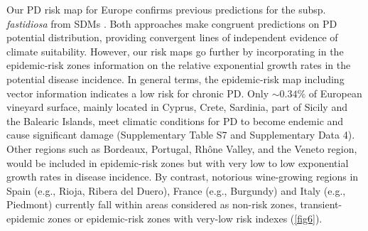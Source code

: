     Our PD risk map for Europe confirms previous predictions for the subsp.
    \textit{fastidiosa} from SDMs \cite{Bragard2019}. Both approaches make
    congruent predictions on PD potential distribution, providing convergent
    lines
    of independent evidence of climate suitability. However, our risk maps go
    further by incorporating in the epidemic-risk zones information on the
    relative
    exponential growth rates in the potential disease incidence. In general
    terms,
    the epidemic-risk map including vector information indicates a low risk for
    chronic PD. Only $\sim 0.34\%$ of European vineyard surface, mainly located
    in
    Cyprus, Crete, Sardinia, part of Sicily and the Balearic Islands, meet
    climatic
    conditions for PD to become endemic and cause significant damage
    (Supplementary
    Table S7 and Supplementary Data 4). Other regions such as Bordeaux,
    Portugal,
    Rh\^one Valley, and the Veneto region, would be included in epidemic-risk
    zones
    but with very low to low exponential growth rates in disease incidence. By
    contrast, notorious wine-growing regions in Spain (e.g., Rioja, Ribera del
    Duero), France (e.g., Burgundy) and Italy (e.g., Piedmont) currently fall
    within areas considered as non-risk zones, transient-epidemic zones or
    epidemic-risk zones with very-low risk indexes (\cref{fig6}).

